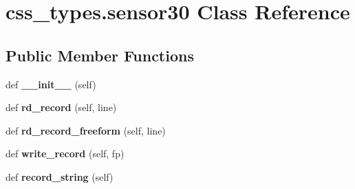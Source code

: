 \hypertarget{classcss__types_1_1sensor30}{}\section{css\+\_\+types.\+sensor30 Class Reference}
\label{classcss__types_1_1sensor30}
\subsection*{Public Member Functions}
\begin{DoxyCompactItemize}
\item 
\hypertarget{classcss__types_1_1sensor30_a63977aad3406c627ea99504f43b25668}{}def {\bfseries \+\_\+\+\_\+init\+\_\+\+\_\+} (self)\label{classcss__types_1_1sensor30_a63977aad3406c627ea99504f43b25668}

\item 
\hypertarget{classcss__types_1_1sensor30_ac696adc34d4f29db22b191620571acd7}{}def {\bfseries rd\+\_\+record} (self, line)\label{classcss__types_1_1sensor30_ac696adc34d4f29db22b191620571acd7}

\item 
\hypertarget{classcss__types_1_1sensor30_a093af5dfd34e9e921ff6c28e3b47deeb}{}def {\bfseries rd\+\_\+record\+\_\+freeform} (self, line)\label{classcss__types_1_1sensor30_a093af5dfd34e9e921ff6c28e3b47deeb}

\item 
\hypertarget{classcss__types_1_1sensor30_af0b9070a46dca89ba76e8ef264449889}{}def {\bfseries write\+\_\+record} (self, fp)\label{classcss__types_1_1sensor30_af0b9070a46dca89ba76e8ef264449889}

\item 
\hypertarget{classcss__types_1_1sensor30_a9a46147417b8412d53602c0629908db1}{}def {\bfseries record\+\_\+string} (self)\label{classcss__types_1_1sensor30_a9a46147417b8412d53602c0629908db1}

\end{DoxyCompactItemize}
